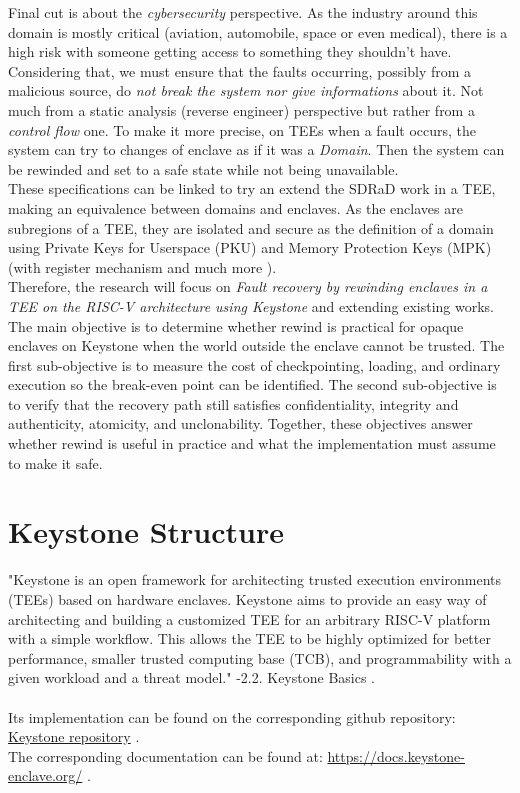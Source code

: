 \documentclass[11pt,a4paper]{report}
\newcommand{\keystonegithub}{%
    \href{https://github.com/keystone-enclave/keystone}{Keystone repository} \cite{keystone-repo}
}
\begin{document}
Final cut is about the \textit{cybersecurity} perspective. 
As the industry around this domain is mostly critical (aviation, automobile, space or even medical), there is a high risk with someone getting access to something they shouldn't have. 
Considering that, we must ensure that the faults occurring, possibly from a malicious source, do \textit{not break the system nor give informations} about it. 
Not much from a static analysis (reverse engineer) perspective but rather from a \textit{control flow} one. 
To make it more precise, on TEEs when a fault occurs, the system can try to changes of enclave as if it was a \textit{Domain}. 
Then the system can be rewinded and set to a safe state while not being unavailable.
\\

These specifications can be linked to try an extend the SDRaD \cite{sdrad} work in a TEE, making an equivalence between domains and enclaves. 
As the enclaves are subregions of a TEE, they are isolated and secure as the definition of a domain using Private Keys for Userspace (PKU) and Memory Protection Keys (MPK) (with register mechanism and much more \cite{sdrad}). \\

Therefore, the research will focus on \textit{Fault recovery by rewinding enclaves in a TEE on the RISC-V architecture using Keystone} and extending existing works.
The main objective is to determine whether rewind is practical for opaque enclaves on Keystone when the world outside the enclave cannot be trusted.
The first sub-objective is to measure the cost of checkpointing, loading, and ordinary execution so the break-even point can be identified.
The second sub-objective is to verify that the recovery path still satisfies confidentiality, integrity and authenticity, atomicity, and unclonability.
Together, these objectives answer whether rewind is useful in practice and what the implementation must assume to make it safe.
\\








\chapter{Keystone Structure}
\label{chap:Keystone}
"Keystone is an open framework for architecting trusted execution environments (TEEs) based on hardware enclaves. Keystone aims to provide an easy way of architecting and building a customized TEE for an arbitrary RISC-V platform with a simple workflow. 
This allows the TEE to be highly optimized for better performance, smaller trusted computing base (TCB), and programmability with a given workload and a threat model." 
-2.2. Keystone Basics \cite{keystone-docs}.
\\\\
Its implementation can be found on the corresponding github repository: \keystonegithub.
\\
The corresponding documentation can be found at:
\href{https://docs.keystone-enclave.org/en/latest/index.html}{https://docs.keystone-enclave.org/} 
\cite{keystone-web,keystone-docs}.
\end{document}
